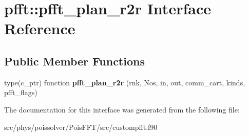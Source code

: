 \hypertarget{interfacepfft_1_1pfft__plan__r2r}{}\section{pfft\+:\+:pfft\+\_\+plan\+\_\+r2r Interface Reference}
\label{interfacepfft_1_1pfft__plan__r2r}
\subsection*{Public Member Functions}
\begin{DoxyCompactItemize}
\item 
type(c\+\_\+ptr) function {\bfseries pfft\+\_\+plan\+\_\+r2r} (rnk, Nos, in, out, comm\+\_\+cart, kinds, pfft\+\_\+flags)\hypertarget{interfacepfft_1_1pfft__plan__r2r_a3073bf76f36662af5f79273c5cbcd664}{}\label{interfacepfft_1_1pfft__plan__r2r_a3073bf76f36662af5f79273c5cbcd664}

\end{DoxyCompactItemize}


The documentation for this interface was generated from the following file\+:\begin{DoxyCompactItemize}
\item 
src/phys/poissolver/\+Pois\+F\+F\+T/src/custompfft.\+f90\end{DoxyCompactItemize}

